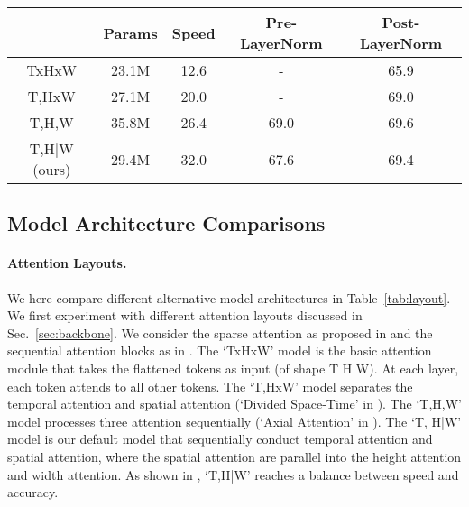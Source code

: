 \begin{table*}
\centering
\caption{Results of \textbf{different attention-module layouts and layer-normalization positions}.  `Speed' is the normalized pre-training speed (i.e., number of samples / GPU / second). Models are pre-trained on \htm for 10 epochs. The result numbers represent \ucf accuracy.  }
\begin{tabular}{@{}ccc|cc@{}}
\toprule
        & Params & Speed & Pre-LayerNorm & Post-LayerNorm \\ \midrule
TxHxW                             & 23.1M       &  12.6         &   -            & 65.9           \\
T,HxW \cite{bertasius2021space}   & 27.1M       &  20.0         &   -            & 69.0          \\
T,H,W                             & 35.8M       &  26.4         & 69.0           & 69.6           \\
T,H|W (ours)                      & 29.4M       &  32.0         & 67.6           & 69.4           \\\bottomrule
\end{tabular}\label{tab:layout}
\end{table*}



\subsection{Model Architecture Comparisons}
\label{sec:appen_arch_analysis}
\paragraph{Attention Layouts.}
We here compare different alternative model architectures in Table~\ref{tab:layout}.
We first experiment with different attention layouts discussed in Sec.~\ref{sec:backbone}.
We consider the sparse attention as proposed in \cite{child2019generating} and the sequential attention blocks as in \cite{bertasius2021space}. 
The `TxHxW' model is the basic attention module that takes the flattened tokens as input (of shape T \x H \x W). 
At each layer, each token attends to all other tokens.
The `T,HxW' model separates the temporal attention and spatial attention (`Divided Space-Time' in \cite{bertasius2021space}). 
The `T,H,W' model processes three attention sequentially (`Axial Attention' in \cite{bertasius2021space}).
The `T, H|W' model is our default model that sequentially conduct temporal attention and spatial attention, where the spatial attention are parallel into the height attention and width attention.
As shown in , `T,H|W' reaches a balance between speed and accuracy.

